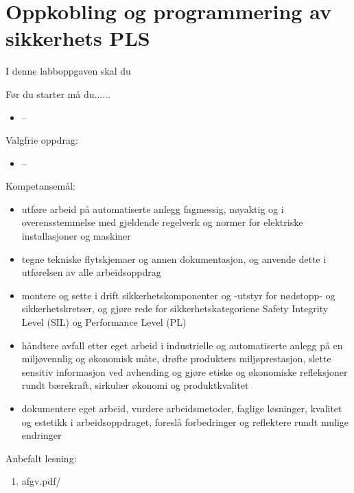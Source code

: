 
\noindent
\section*{Oppkobling og programmering av sikkerhets PLS}

\vskip 5pt
I denne labboppgaven skal du

Før du  starter må du......
\begin{itemize}[noitemsep]
	\item --
\end{itemize}

\vskip 5pt 
Valgfrie oppdrag:

\vskip 5pt 
\begin{itemize}[noitemsep]
	\item --
\end{itemize}



\vskip 2.5pt 
Kompetansemål:
\begin{itemize}[noitemsep]

	\item utføre arbeid på automatiserte anlegg fagmessig, nøyaktig og i overensstemmelse med gjeldende regelverk og normer for elektriske installasjoner og maskiner
	\item tegne tekniske flytskjemaer og annen dokumentasjon, og anvende dette i utførelsen av alle arbeidsoppdrag
	\item montere og sette i drift sikkerhetskomponenter og -utstyr for nødstopp- og sikkerhetskretser, og gjøre rede for sikkerhetskategoriene Safety Integrity Level (SIL) og Performance Level (PL)
	\item håndtere avfall etter eget arbeid i industrielle og automatiserte anlegg på en miljøvennlig og økonomisk måte, drøfte produkters miljøprestasjon, slette sensitiv informasjon ved avhending og gjøre etiske og økonomiske refleksjoner rundt bærekraft, sirkulær økonomi og produktkvalitet
	\item dokumentere eget arbeid, vurdere arbeidsmetoder, faglige løsninger, kvalitet og estetikk i arbeidsoppdraget, foreslå forbedringer og reflektere rundt mulige endringer




\end{itemize}

Anbefalt lesning:

\begin{enumerate}
	\item afgv.pdf/ 
\end{enumerate}

